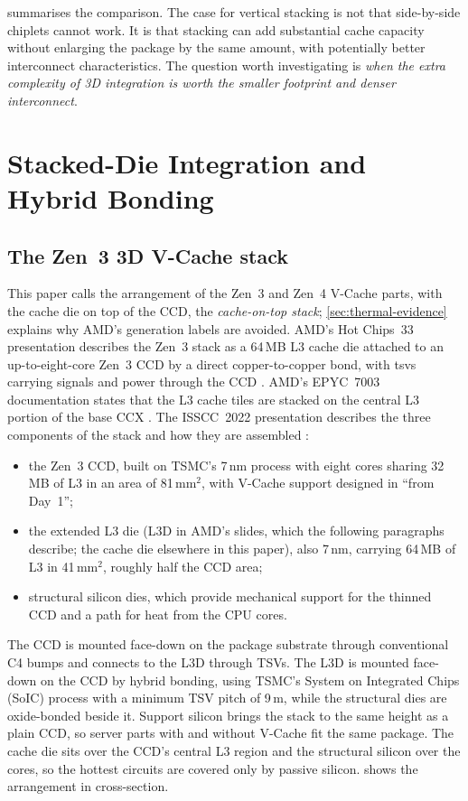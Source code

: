  summarises the comparison. The case for vertical stacking is not that side-by-side chiplets cannot work. It is that stacking can add substantial cache capacity without enlarging the package by the same amount, with potentially better interconnect characteristics. The question worth investigating is \emph{when the extra complexity of 3D integration is worth the smaller footprint and denser interconnect}.

\section{Stacked-Die Integration and Hybrid Bonding}
\label{sec:hybrid-bonding}

\subsection{The Zen~3 3D V-Cache stack}
This paper calls the arrangement of the Zen~3 and Zen~4 V-Cache parts, with the cache die on top of the CCD, the \emph{cache-on-top stack}; \cref{sec:thermal-evidence} explains why AMD's generation labels are avoided. AMD's Hot Chips~33 presentation describes the Zen~3 stack as a 64\,MB L3 cache die attached to an up-to-eight-core Zen~3 CCD by a direct copper-to-copper bond, with \glspl{tsv} carrying signals and power through the CCD \cite{swaminathanAdvancedPackagingEnabling2021}. AMD's EPYC~7003 documentation states that the L3 cache tiles are stacked on the central L3 portion of the base CCX \cite{amd2022epyc7003}. The ISSCC~2022 presentation describes the three components of the stack and how they are assembled \cite[slides~10--12, 14, 16--17]{wuu2022vcache}:
\begin{itemize}
  \item the Zen~3 CCD, built on TSMC's 7\,nm process with eight cores sharing 32\,MB of L3 in an area of 81\,mm$^2$, with V-Cache support designed in ``from Day~1'';
  \item the extended L3 die (L3D in AMD's slides, which the following paragraphs describe; the cache die elsewhere in this paper), also 7\,nm, carrying 64\,MB of L3 in 41\,mm$^2$, roughly half the CCD area;
  \item structural silicon dies, which provide mechanical support for the thinned CCD and a path for heat from the CPU cores.
\end{itemize}
The CCD is mounted face-down on the package substrate through conventional C4 bumps and connects to the L3D through TSVs. The L3D is mounted face-down on the CCD by hybrid bonding, using TSMC's System on Integrated Chips (SoIC) process with a minimum TSV pitch of 9\,\textmu m, while the structural dies are oxide-bonded beside it. Support silicon brings the stack to the same height as a plain CCD, so server parts with and without V-Cache fit the same package. The cache die sits over the CCD's central L3 region \cite{amd2022epyc7003} and the structural silicon over the cores, so the hottest circuits are covered only by passive silicon.  shows the arrangement in cross-section.

